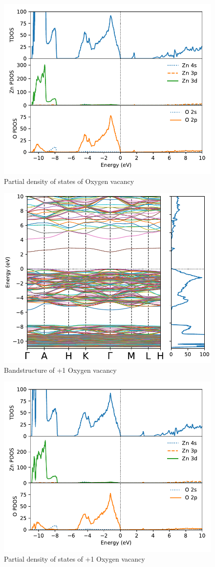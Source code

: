 \begin{figure}[tbh!]
	\centering
	\includegraphics[width=0.6\linewidth]{"images/rnd/dos-pdos_O_vac"}
	\caption[Partial density of states of Oxygen vacancy]{Partial density of states of Oxygen vacancy}
\end{figure}

\begin{figure}[tbh!]
	\centering
	\includegraphics[width=0.6\linewidth]{"images/rnd/band-dos_O_vac-p1"}
	\caption[Bandstructure of +1 Oxygen vacancy]{Bandstructure of +1 Oxygen vacancy}
\end{figure}

\begin{figure}[tbh!]
	\centering
	\includegraphics[width=0.6\linewidth]{"images/rnd/dos-pdos_O_vac-p1"}
	\caption[Partial density of states of +1 Oxygen vacancy]{Partial density of states of +1 Oxygen vacancy}
\end{figure}

